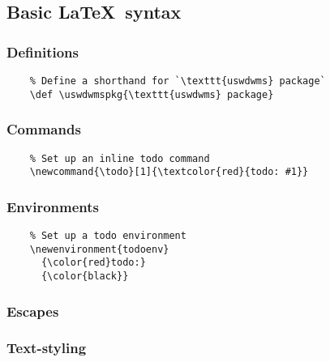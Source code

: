 \subsection{Basic \LaTeX\ syntax}
\subsubsection*{Definitions}
\begin{listing}[H]
  \captionsetup{skip=\skiplistingcaptionlen}
  \begin{verbatim}
    % Define a shorthand for `\texttt{uswdwms} package`
    \def \uswdwmspkg{\texttt{uswdwms} package}
  \end{verbatim}
  \caption{\LaTeX\ \texttt{\textbackslash def} command examples}
  \label{example:lst:def}
\end{listing}
\subsubsection*{Commands}
\begin{listing}[H]
  \captionsetup{skip=\skiplistingcaptionlen}
  \begin{verbatim}
    % Set up an inline todo command
    \newcommand{\todo}[1]{\textcolor{red}{todo: #1}}
  \end{verbatim}
  \caption{\LaTeX\ \texttt{\textbackslash newcommand} command example}
  \label{example:lst:newcommand}
\end{listing}
\subsubsection*{Environments}
\begin{listing}[H]
  \captionsetup{skip=\skiplistingcaptionlen}
  \begin{verbatim}
    % Set up a todo environment
    \newenvironment{todoenv}
      {\color{red}todo:}
      {\color{black}}
  \end{verbatim}
  \caption{\LaTeX\ \texttt{\textbackslash newenvironment} command example}
  \label{example:lst:newenvironment}
\end{listing}
\subsubsection*{Escapes}

\subsubsection*{Text-styling}

